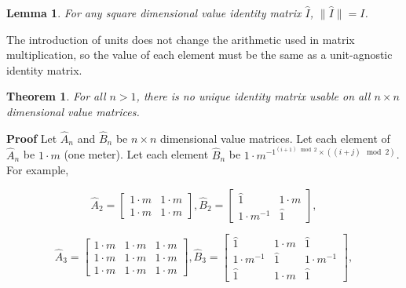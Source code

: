 \documentclass[10pt,letterpaper]{article}
\newtheorem{lem}{Lemma}[section]
\newtheorem{thm}{Theorem}[section]
\newenvironment{proof}{\noindent\textbf{Proof} }{\qed \newline}
\newcommand{\qed}{\nobreak \ifvmode \relax \else
      \ifdim\lastskip<1.5em \hskip-\lastskip
      \hskip1.5em plus0em minus0.5em \fi \nobreak
      \vrule height0.75em width0.5em depth0.25em\fi}
\numberwithin{equation}{section}
\begin{document}
\begin{lem} \label{dimensional_identities_all_have_the_values_of_I}
  For any square dimensional value identity matrix $\hat I$, $\| \hat
  I \| = I$.\end{lem}

The introduction of units does not change the arithmetic used in
matrix multiplication, so the value of each element must be the same
as a unit-agnostic identity matrix.

\begin{thm}For all $n > 1$, there is no unique identity matrix usable
  on all $n \times n$ dimensional value matrices.\end{thm}

\begin{proof}Let $\hat A_n$ and $\hat B_n$ be $n \times n$ dimensional
  value matrices.  Let each element of $\hat A_n$ be $1 \cdot m$ (one
  meter).  Let each element $\hat B_n$ be $1 \cdot m^{-1^{(i + 1) \mod
      2} \times ((i + j) \mod 2)}$.  For example,
 
\[ \hat A_2 = \left[ \begin{matrix} 
  1 \cdot m & 1 \cdot m \\
  1 \cdot m & 1 \cdot m
 \end{matrix} \right],
 \hat B_2 = \left[ \begin{matrix} 
  \hat 1 & 1 \cdot m \\
  1 \cdot m^{-1} & \hat 1
 \end{matrix} \right], \]

\[ \hat A_3 = \left[ \begin{matrix} 
  1 \cdot m & 1 \cdot m & 1 \cdot m \\
  1 \cdot m & 1 \cdot m & 1 \cdot m \\
  1 \cdot m & 1 \cdot m & 1 \cdot m
 \end{matrix} \right],
 \hat B_3 = \left[ \begin{matrix} 
  \hat 1 & 1 \cdot m & \hat 1 \\
  1 \cdot m^{-1} & \hat 1 & 1 \cdot m^{-1} \\
  \hat 1 & 1 \cdot m & \hat 1
 \end{matrix} \right], \]


\end{proof}
\end{document}

